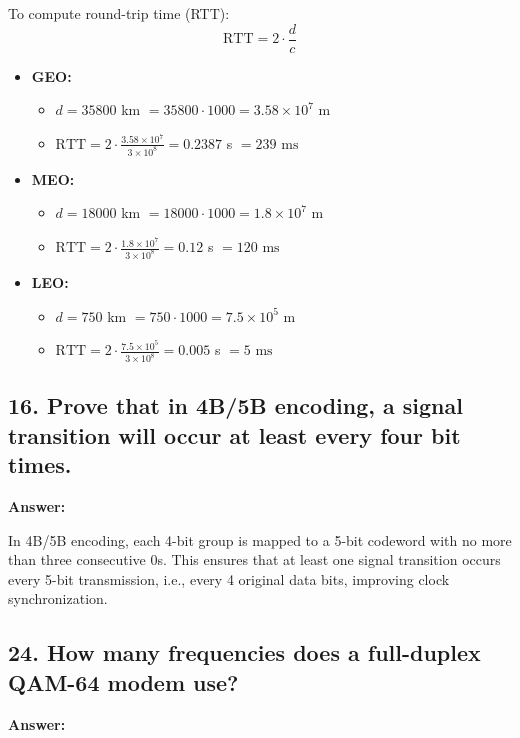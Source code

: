 \documentclass{article}
\begin{document}
To compute round-trip time (RTT):
\[
\text{RTT} = 2 \cdot \frac{d}{c}
\]

\begin{itemize}
  \item \textbf{GEO:}
    \begin{itemize}
      \item $d = 35800$ km $= 35800 \cdot 1000 = 3.58 \times 10^7$ m
      \item $\text{RTT} = 2 \cdot \frac{3.58 \times 10^7}{3 \times 10^8} = 0.2387$ s $= \boxed{239 \text{ ms}}$
    \end{itemize}

  \item \textbf{MEO:}
    \begin{itemize}
      \item $d = 18000$ km $= 18000 \cdot 1000 = 1.8 \times 10^7$ m
      \item $\text{RTT} = 2 \cdot \frac{1.8 \times 10^7}{3 \times 10^8} = 0.12$ s $= \boxed{120 \text{ ms}}$
    \end{itemize}

  \item \textbf{LEO:}
    \begin{itemize}
      \item $d = 750$ km $= 750 \cdot 1000 = 7.5 \times 10^5$ m
      \item $\text{RTT} = 2 \cdot \frac{7.5 \times 10^5}{3 \times 10^8} = 0.005$ s $= \boxed{5 \text{ ms}}$
    \end{itemize}
\end{itemize}

\subsection*{16. Prove that in 4B/5B encoding, a signal transition will occur at least every four bit times.}

\textbf{Answer:}

In 4B/5B encoding, each 4-bit group is mapped to a 5-bit codeword with no more than three consecutive 0s.
This ensures that at least one signal transition occurs every 5-bit transmission, i.e., every 4 original data bits, improving clock synchronization.

\subsection*{24. How many frequencies does a full-duplex QAM-64 modem use?}

\textbf{Answer:}
\end{document}
